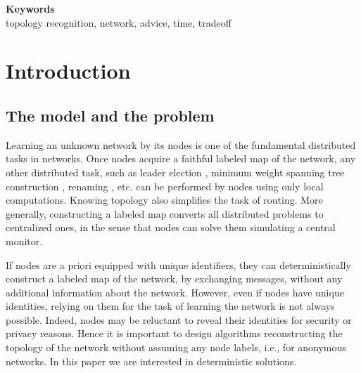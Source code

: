\documentclass{article}
\begin{document}
\begin{center}
{\bf Keywords}\\
topology recognition, network, advice, time, tradeoff
\end{center}


\section{Introduction}


\subsection{The model and the problem}

Learning an unknown network by its nodes is one of the fundamental distributed tasks in networks.
Once nodes acquire a faithful labeled map of the network, any other 
distributed task, such as leader election \cite{HS,P}, minimum weight spanning tree construction \cite{A}, 
renaming \cite{ABDKPR}, etc. can be performed by nodes using
only local computations. Knowing topology also simplifies the task of routing. 
More generally, constructing a labeled map converts all distributed problems to centralized ones, 
in the sense that nodes can solve them simulating a central monitor.

If nodes are a priori equipped with unique identifiers, they can deterministically 
construct a labeled map of the network, by exchanging messages, without any additional  information about the network. However,
even if nodes have unique identities, 
relying on them 
for the task of learning the network is not always possible. Indeed, nodes may be reluctant to reveal their identities for security or privacy reasons. 
Hence it is
important to design algorithms reconstructing the topology of the network without assuming any node labels, i.e., for anonymous networks. In this paper we are interested in deterministic solutions.
\end{document}
